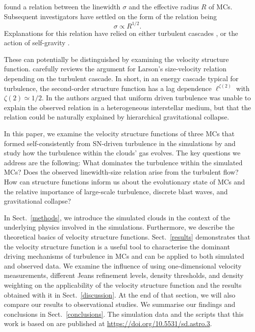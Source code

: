 \citet{Larson1981} found a relation between the linewidth $\sigma$ and the effective radius $R$ of MCs.
Subsequent investigators have settled on the form of the relation being \citep{Solomon1987,Falgarone2009,Heyer2009}
\begin{equation} \label{eq:larson}
    \sigma \propto R^{1/2}.
\end{equation}
Explanations for this relation have relied on either turbulent cascades \citep{Larson1981,Kritsuk2013,Kritsuk2015,Gnedin2015,Padoan2016}, or the action of self-gravity \citep{Elmegreen1993,Vazquez2006,Elmegreen2007,Heyer2009,Ballesteros2011}.

These can potentially be distinguished by examining the velocity structure function.
\citet{Kritsuk2013} carefully reviews the argument for Larson's size-velocity relation depending on the turbulent cascade. 
In short, in an energy cascade typical for turbulence, the second-order structure function has a lag dependence $\ell^{\zeta(2)}$ with $\zeta(2) \simeq 1/2$. 
In \citet[hereafter ]{IbanezMejia2016} the authors argued that uniform driven turbulence was unable to explain the observed relation in a heterogeneous interstellar medium, but that the relation could be naturally explained by hierarchical gravitational collapse.

In this paper, we examine the velocity structure functions of three MCs that formed self-consistently from SN-driven turbulence in the simulations by \citet[hereafter  and ]{IbanezMejia2016,IbanezMejia2017} and study how the turbulence within the clouds' gas evolves.
The key questions we address are the following:
What dominates the turbulence within the simulated MCs? 
Does the observed linewidth-size relation arise from the turbulent flow?
How can structure functions inform us about the evolutionary state of MCs and the relative importance of large-scale turbulence, discrete blast waves, and gravitational collapse?

In Sect.~\ref{methods}, we introduce the simulated clouds in the context of the underlying physics involved in the simulations.
Furthermore, we describe the theoretical basics of velocity structure functions.
Sect.~\ref{results} demonstrates that the velocity structure function is a useful tool to characterise the dominant driving mechanisms of turbulence in MCs and can be applied to both simulated and observed data. 
We examine the influence of using one-dimensional velocity measurements, different Jeans refinement levels, density thresholds, and density weighting on the applicability of the velocity structure function and the results obtained with it in Sect.~\ref{discussion}.  
At the end of that section, we will also compare our results to observational studies.
We summarise our findings and conclusions in Sect.~\ref{conclusions}.
The simulation data and the scripts that this work is based on are published at {\url{https://doi.org/10.5531/sd.astro.3}}.




\endinput
